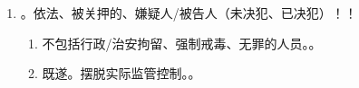 \begin{enumerate}
\begin{enumerate}
          \item 犯罪数额。新增。\yi 上游犯罪没达定罪数额，你不构成。\er 销赃不看数额。
          \item 主体。。。
          \item {}。
        \end{enumerate}
  \item {}。依法、被关押的、嫌疑人/被告人（未决犯、已决犯）！！
        \begin{enumerate}
          \item 不包括行政/治安拘留、强制戒毒、无罪的人员。。
          \item 既遂。摆脱实际监管控制。。
        \end{enumerate}
\end{enumerate}
